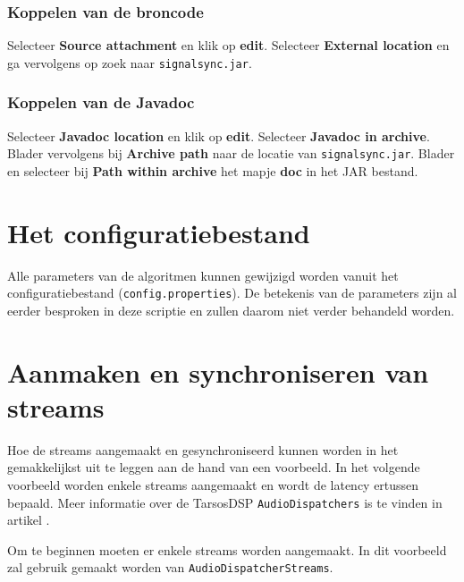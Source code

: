 \subsubsection{Koppelen van de broncode}

Selecteer \textbf{Source attachment} en klik op \textbf{edit}. Selecteer \textbf{External location} en ga vervolgens op zoek naar \texttt{signalsync.jar}.

\subsubsection{Koppelen van de Javadoc}

Selecteer \textbf{Javadoc location} en klik op \textbf{edit}. Selecteer \textbf{Javadoc in archive}. Blader vervolgens bij \textbf{Archive path} naar de locatie van \texttt{signalsync.jar}. Blader en selecteer bij \textbf{Path within archive} het mapje \textbf{doc} in het JAR bestand.

\section*{Het configuratiebestand}

Alle parameters van de algoritmen kunnen gewijzigd worden vanuit het configuratiebestand (\texttt{config.properties}). De betekenis van de parameters zijn al eerder besproken in deze scriptie en zullen daarom niet verder behandeld worden.

\section*{Aanmaken en synchroniseren van streams}

Hoe de streams aangemaakt en gesynchroniseerd kunnen worden in het gemakkelijkst uit te leggen aan de hand van een voorbeeld. In het volgende voorbeeld worden enkele streams aangemaakt en wordt de latency ertussen bepaald. Meer informatie over de TarsosDSP \texttt{AudioDispatchers} is te vinden in artikel \cite{six2014tarsosdsp}.

Om te beginnen moeten er enkele streams worden aangemaakt. In dit voorbeeld zal gebruik gemaakt worden van \texttt{AudioDispatcherStreams}. \\

\lstset{basicstyle=\footnotesize,style=javaStyle}

